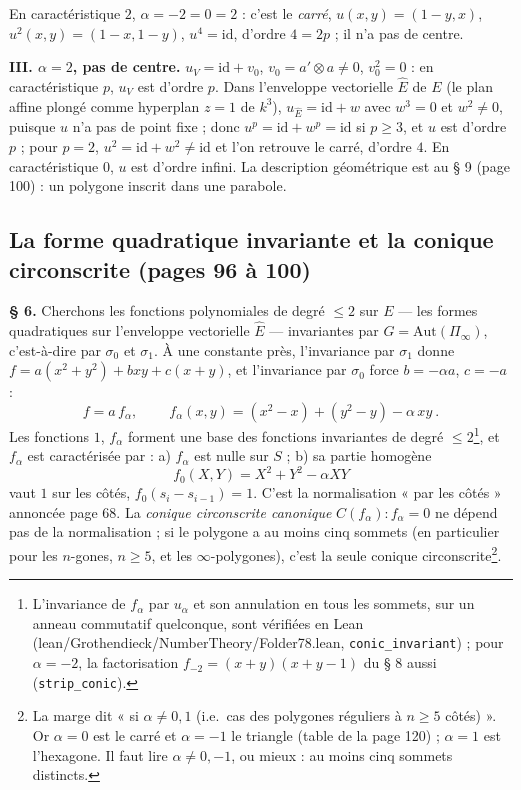 \documentclass[11pt,a4paper]{article}
\begin{document}
En caractéristique $2$, $\alpha = -2 = 0 = 2$ : c'est le \emph{carré},
$u(x, y) = (1 - y, x)$, $u^2(x, y) = (1 - x, 1 - y)$, $u^4 = \mathrm{id}$,
d'ordre $4 = 2p$ ; il n'a pas de centre.

\textbf{III. $\alpha = 2$, pas de centre.} $u_V = \mathrm{id} + v_0$, $v_0 =
a' \otimes a \neq 0$, $v_0^2 = 0$ : en caractéristique $p$, $u_V$ est d'ordre
$p$. Dans l'enveloppe vectorielle $\hat E$ de $E$ (le plan affine plongé comme
hyperplan $z = 1$ de $k^3$), $u_{\hat E} = \mathrm{id} + w$ avec $w^3 = 0$ et
$w^2 \neq 0$, puisque $u$ n'a pas de point fixe ; donc $u^p = \mathrm{id} +
w^p = \mathrm{id}$ si $p \geq 3$, et $u$ est d'ordre $p$ ; pour $p = 2$,
$u^2 = \mathrm{id} + w^2 \neq \mathrm{id}$ et l'on retrouve le carré, d'ordre
$4$. En caractéristique $0$, $u$ est d'ordre infini. La description
géométrique est au § 9 (page 100) : un polygone inscrit dans une parabole.

\subsection*{La forme quadratique invariante et la conique circonscrite (pages 96 à 100)}

\textbf{§ 6.} Cherchons les fonctions polynomiales de degré $\leq 2$ sur $E$ ---
les formes quadratiques sur l'enveloppe vectorielle $\hat E$ --- invariantes
par $G = \mathrm{Aut}(\Pi_\infty)$, c'est-à-dire par $\sigma_0$ et $\sigma_1$.
À une constante près, l'invariance par $\sigma_1$ donne $f = a(x^2 + y^2) +
bxy + c(x + y)$, et l'invariance par $\sigma_0$ force $b = -\alpha a$, $c =
-a$ :
\[
  f = a\, f_\alpha, \qquad
  \boxed{\ f_\alpha(x, y) = (x^2 - x) + (y^2 - y) - \alpha\, xy\ } .
\]
Les fonctions $1$, $f_\alpha$ forment une base des fonctions invariantes de
degré $\leq 2$\footnote{L'invariance de $f_\alpha$ par $u_\alpha$ et son
annulation en tous les sommets, sur un anneau commutatif quelconque, sont
vérifiées en Lean (lean/Grothendieck/NumberTheory/Folder78.lean,
\texttt{conic\_invariant}) ; pour $\alpha = -2$, la factorisation
$f_{-2} = (x+y)(x+y-1)$ du § 8 aussi (\texttt{strip\_conic}).}, et $f_\alpha$ est caractérisée par : a) $f_\alpha$ est nulle
sur $S$ ; b) sa partie homogène
\[
  f_0(X, Y) = X^2 + Y^2 - \alpha XY
\]
vaut $1$ sur les côtés, $f_0(s_i - s_{i-1}) = 1$. C'est la normalisation
« par les côtés » annoncée page 68. La \emph{conique circonscrite canonique}
$C(f_\alpha) : f_\alpha = 0$ ne dépend pas de la normalisation ; si le
polygone a au moins cinq sommets (en particulier pour les $n$-gones, $n \geq
5$, et les $\infty$-polygones), c'est la seule conique
circonscrite\footnote{La marge dit « si $\alpha \neq 0, 1$ (i.e.\ cas des
polygones réguliers à $n \geq 5$ côtés) ». Or $\alpha = 0$ est le carré et
$\alpha = -1$ le triangle (table de la page 120) ; $\alpha = 1$ est
l'hexagone. Il faut lire $\alpha \neq 0, -1$, ou mieux : au moins cinq
sommets distincts.}.
\end{document}
